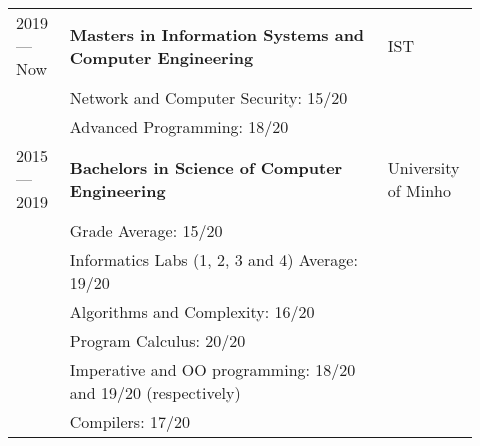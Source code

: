 \documentclass{article}
\begin{document}
\begin{tabular}{p{0.11\linewidth}p{0.65\linewidth}p{0.16\linewidth}}

    2019 --- Now & \textbf{Masters in Information Systems and Computer
    Engineering} & IST\\
    & Network and Computer Security: 15/20 &\\
    & Advanced Programming: 18/20 &\\

    2015 --- 2019 & \textbf{Bachelors in Science of Computer Engineering} &
    University of Minho\\
    & Grade Average: 15/20 &\\
    & Informatics Labs (1, 2, 3 and 4) Average: 19/20 & \\
    & Algorithms and Complexity: 16/20 & \\
    & Program Calculus: 20/20 & \\
    & Imperative and OO programming: 18/20 and 19/20 (respectively) &\\
    & Compilers: 17/20 &\\

\end{tabular}


\end{document}
